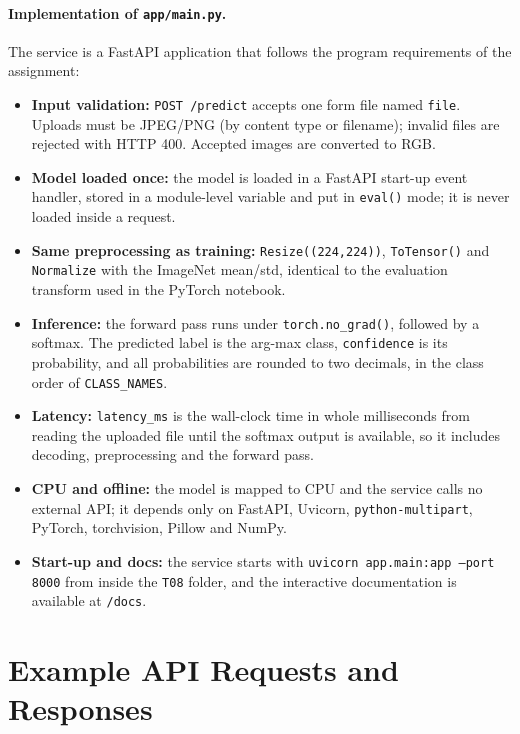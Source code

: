 \documentclass[11pt,a4paper]{article}
\newcommand{\TeamID}{T08}
\begin{document}
\paragraph{Implementation of \texttt{app/main.py}.}
The service is a FastAPI application that follows the program requirements of the assignment:
\begin{itemize}
  \item \textbf{Input validation:} \texttt{POST /predict} accepts one form file named \texttt{file}. Uploads must be JPEG/PNG (by content type or filename); invalid files are rejected with HTTP 400. Accepted images are converted to RGB.
  \item \textbf{Model loaded once:} the model is loaded in a FastAPI start-up event handler, stored in a module-level variable and put in \texttt{eval()} mode; it is never loaded inside a request.
  \item \textbf{Same preprocessing as training:} \texttt{Resize((224,224))}, \texttt{ToTensor()} and \texttt{Normalize} with the ImageNet mean/std, identical to the evaluation transform used in the PyTorch notebook.
  \item \textbf{Inference:} the forward pass runs under \texttt{torch.no\_grad()}, followed by a softmax. The predicted label is the arg-max class, \texttt{confidence} is its probability, and all probabilities are rounded to two decimals, in the class order of \texttt{CLASS\_NAMES}.
  \item \textbf{Latency:} \texttt{latency\_ms} is the wall-clock time in whole milliseconds from reading the uploaded file until the softmax output is available, so it includes decoding, preprocessing and the forward pass.
  \item \textbf{CPU and offline:} the model is mapped to CPU and the service calls no external API; it depends only on FastAPI, Uvicorn, \texttt{python-multipart}, PyTorch, torchvision, Pillow and NumPy.
  \item \textbf{Start-up and docs:} the service starts with \texttt{uvicorn app.main:app --port 8000} from inside the \texttt{\TeamID} folder, and the interactive documentation is available at \texttt{/docs}.
\end{itemize}

\section{Example API Requests and Responses}
\label{sec:api}
\end{document}
